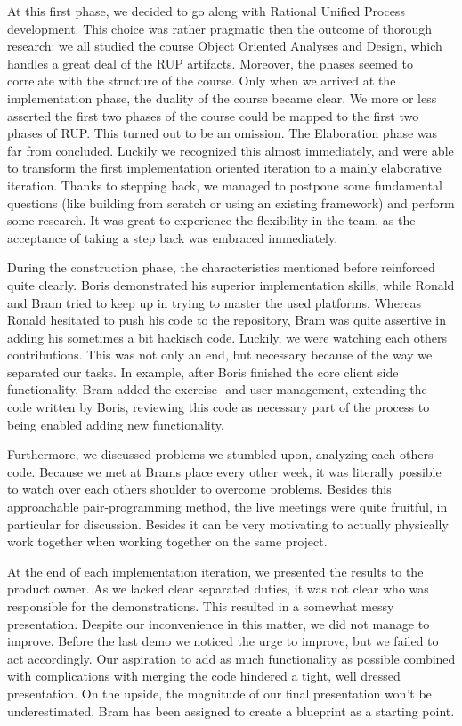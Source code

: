 At this first phase, we decided to go along with Rational Unified Process
development. This choice was rather pragmatic then the outcome of thorough
research: we all studied the course Object Oriented Analyses and Design, which
handles a great deal of the RUP artifacts. Moreover, the phases seemed to 
correlate with the structure of the course. Only when we arrived at the 
implementation phase, the duality of the course became clear. We more or less
asserted the first two phases of the course could be mapped to the first two
phases of RUP. This turned out to be an omission. The Elaboration phase was far
from concluded. Luckily we recognized this almost immediately, and were able
to transform the first implementation oriented iteration to a mainly 
elaborative iteration. Thanks to stepping back, we managed to postpone some
fundamental questions (like building from scratch or using an existing
framework) and perform some research. It was great to experience the
flexibility in the team, as the acceptance of taking a step back was
embraced immediately. 

During the construction phase, the characteristics mentioned before reinforced
quite clearly. Boris demonstrated his superior implementation skills, 
while Ronald and Bram tried to keep up in trying to master the used platforms. 
Whereas Ronald hesitated to push his code to the repository, Bram was quite 
assertive in adding his sometimes a bit hackisch code. Luckily, we were watching 
each others contributions. This was not only an end, but necessary because of
the way we separated our tasks. In example, after Boris finished the core client
side functionality, Bram added the exercise- and user management, extending the
code written by Boris, reviewing this code as necessary part of the process
to being enabled adding new functionality.

Furthermore, we discussed problems we stumbled upon, analyzing each others code.
Because we met at Brams place every other week, it was literally possible to
watch over each others shoulder to overcome problems. Besides this approachable
pair-programming method, the live meetings were quite fruitful, in particular
for discussion. Besides it can be very motivating to actually physically work
together when working together on the same project. 

At the end of each implementation iteration, we presented the results to the product
owner. As we lacked clear separated duties, it was not clear who was responsible 
for the demonstrations. This resulted in a somewhat messy presentation. Despite
our inconvenience in this matter, we did not manage to improve. Before 
the last demo we noticed the urge to improve, but we failed to act
accordingly. Our aspiration to add as much functionality as possible combined
with complications with merging the code hindered a tight, well dressed
presentation. On the upside, the magnitude of our final presentation won't be
underestimated. Bram has been assigned to create a blueprint as a starting
point.

